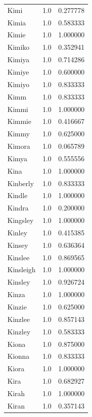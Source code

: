 \documentclass[
  letterpaper,
  DIV=11,
  numbers=noendperiod]{scrreprt}
\begin{document}
\begin{tabular}{lrr}
Kimi            &   1.0 &   0.277778 \\
Kimia           &   1.0 &   0.583333 \\
Kimie           &   1.0 &   1.000000 \\
Kimiko          &   1.0 &   0.352941 \\
Kimiya          &   1.0 &   0.714286 \\
Kimiye          &   1.0 &   0.600000 \\
Kimiyo          &   1.0 &   0.833333 \\
Kimm            &   1.0 &   0.833333 \\
Kimmi           &   1.0 &   1.000000 \\
Kimmie          &   1.0 &   0.416667 \\
Kimmy           &   1.0 &   0.625000 \\
Kimora          &   1.0 &   0.065789 \\
Kimya           &   1.0 &   0.555556 \\
Kina            &   1.0 &   1.000000 \\
Kinberly        &   1.0 &   0.833333 \\
Kindle          &   1.0 &   1.000000 \\
Kindra          &   1.0 &   0.200000 \\
Kingsley        &   1.0 &   1.000000 \\
Kinley          &   1.0 &   0.415385 \\
Kinsey          &   1.0 &   0.636364 \\
Kinslee         &   1.0 &   0.869565 \\
Kinsleigh       &   1.0 &   1.000000 \\
Kinsley         &   1.0 &   0.926724 \\
Kinza           &   1.0 &   1.000000 \\
Kinzie          &   1.0 &   0.625000 \\
Kinzlee         &   1.0 &   0.857143 \\
Kinzley         &   1.0 &   0.583333 \\
Kiona           &   1.0 &   0.875000 \\
Kionna          &   1.0 &   0.833333 \\
Kiora           &   1.0 &   1.000000 \\
Kira            &   1.0 &   0.682927 \\
Kirah           &   1.0 &   1.000000 \\
Kiran           &   1.0 &   0.357143 \\

\end{tabular}
\end{document}
